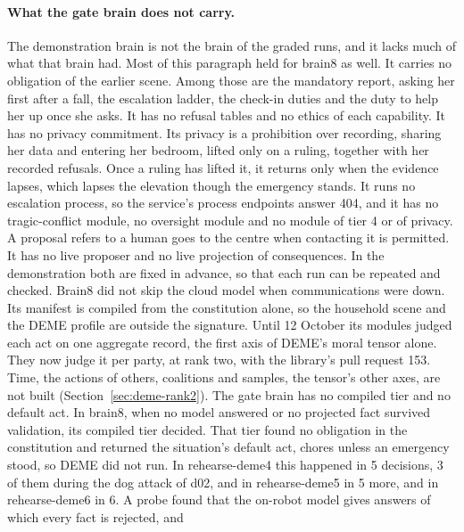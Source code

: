 \paragraph{What the gate brain does not carry.}
The demonstration brain is not the brain of the graded runs, and it lacks much of what that brain
had. Most of this paragraph held for brain8 as well.
It carries no obligation of the earlier scene.
Among those are the mandatory report, asking her first after a fall, the escalation ladder, the
check-in duties and the duty to help her up once she asks.
It has no refusal tables and no ethics of each capability.
It has no privacy commitment.
Its privacy is a prohibition over recording, sharing her data and entering her bedroom, lifted
only on a ruling, together with her recorded refusals.
Once a ruling has lifted it, it returns only when the evidence lapses, which lapses the elevation
though the emergency stands.
It runs no escalation process, so the service's process endpoints answer 404, and it has no
tragic-conflict module, no oversight module and no module of tier 4 or of privacy. A proposal
\deme{} refers to a human goes to the centre when contacting it is permitted.
It has no live proposer and no live projection of consequences. In the demonstration both are
fixed in advance, so that each run can be repeated and checked.
Brain8 did not skip the cloud model when communications were down.
Its manifest is compiled from the constitution alone, so the household scene and the DEME profile
are outside the signature.
Until 12 October its modules judged each act on one aggregate record, the first axis of DEME's
moral tensor alone. They now judge it per party, at rank two, with the library's pull request 153.
Time, the actions of others, coalitions and samples, the tensor's other axes, are not built
(Section~\ref{sec:deme-rank2}).
The gate brain has no compiled tier and no default act. In brain8, when no model answered or no
projected fact survived validation, its compiled tier decided.
That tier found no obligation in the constitution and returned the situation's default act, chores
unless an emergency stood, so DEME did not run.
In rehearse-deme4 this happened in 5 decisions, 3 of them during the dog attack of d02, and in
rehearse-deme5 in 5 more, and in rehearse-deme6 in 6.
A probe found that the on-robot model gives answers of which every fact is rejected, and
